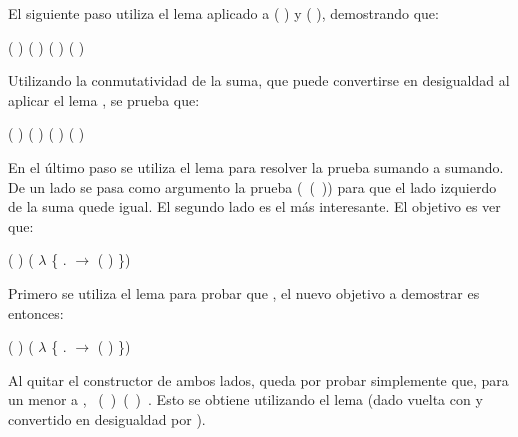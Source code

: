 \begin{AgdaAlign}
El siguiente paso utiliza el lema  aplicado a ( ) y ( ), demostrando que:
\begin{center}
\AgdaFunction{[}  \AgdaFunction{]}  ( ) ( ) \AgdaFunction{$\leq$}  ( ) \AgdaFunction{+} ( )
\end{center}

Utilizando la conmutatividad de la suma, que puede convertirse en desigualdad al aplicar el lema \AgdaFunction{$\sim\rightarrow\leq$}, se prueba que:
\begin{center}
\AgdaFunction{[}  \AgdaFunction{]}  ( ) \AgdaFunction{+} ( ) \AgdaFunction{$\leq$}  ( ) \AgdaFunction{+} ( )
\end{center}

En el último paso se utiliza el lema  para resolver la prueba sumando a sumando. De un lado se pasa como argumento la prueba \hbox{( ( ))} para que el lado izquierdo de la suma quede igual. El segundo lado es el más interesante. El objetivo es ver que: 
\begin{center}
\AgdaFunction{[}  \AgdaFunction{]}  ( ) \AgdaFunction{$\leq$} ( $\lambda$ \{ . $\rightarrow$  ( )  \})
\end{center}

Primero se utiliza el lema  para probar que \AgdaFunction{[}  \AgdaFunction{]}   \AgdaFunction{$\leq$}  , el nuevo objetivo a demostrar es entonces:
\begin{center}
\AgdaFunction{[}  \AgdaFunction{]}  ( ) \AgdaFunction{$\leq$} ( $\lambda$ \{ . $\rightarrow$  ( )  \})
\end{center}

Al quitar el constructor  de ambos lados, queda por probar simplemente que, para un  menor a , \hbox{\AgdaFunction{[}  \AgdaFunction{]} ( ) \AgdaFunction{$\leq$}  ( ) }. Esto se obtiene utilizando el lema  (dado vuelta con  y convertido en desigualdad por \AgdaFunction{$\sim\rightarrow\leq$}).


\end{AgdaAlign}
